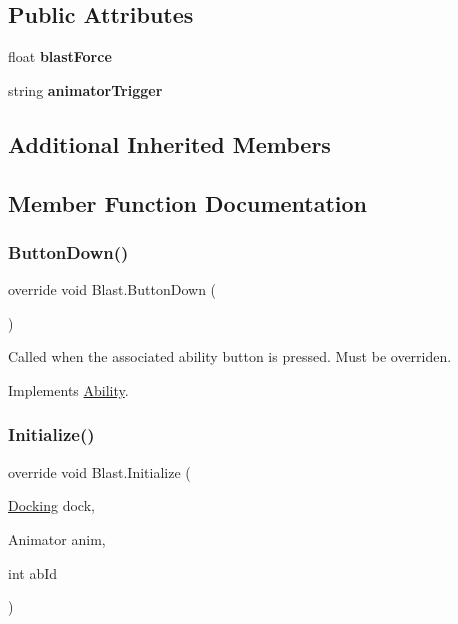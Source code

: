 \subsection*{Public Attributes}
\begin{DoxyCompactItemize}
\item 
\hypertarget{class_blast_af4eeda89a029eef37008a80e3200ee47}{}\label{class_blast_af4eeda89a029eef37008a80e3200ee47} 
float {\bfseries blast\+Force}
\item 
\hypertarget{class_blast_a5c073e6a97eff03cc1404778ab33aff6}{}\label{class_blast_a5c073e6a97eff03cc1404778ab33aff6} 
string {\bfseries animator\+Trigger}
\end{DoxyCompactItemize}
\subsection*{Additional Inherited Members}


\subsection{Member Function Documentation}
\hypertarget{class_blast_ab6e8d7899a858bc2da1978d40d266a63}{}\label{class_blast_ab6e8d7899a858bc2da1978d40d266a63} 
\subsubsection{\texorpdfstring{Button\+Down()}{ButtonDown()}}
{\footnotesize\ttfamily override void Blast.\+Button\+Down (\begin{DoxyParamCaption}{ }\end{DoxyParamCaption})\hspace{0.3cm}{\ttfamily [virtual]}}



Called when the associated ability button is pressed. Must be overriden. 



Implements \hyperlink{class_ability_a7722265862f8b29828315725415ce266}{Ability}.

\hypertarget{class_blast_a1c0b1bd2d101c05fdbe09d32a5c5c44a}{}\label{class_blast_a1c0b1bd2d101c05fdbe09d32a5c5c44a} 
\subsubsection{\texorpdfstring{Initialize()}{Initialize()}}
{\footnotesize\ttfamily override void Blast.\+Initialize (\begin{DoxyParamCaption}\item[{\hyperlink{class_docking}{Docking}}]{dock,  }\item[{Animator}]{anim,  }\item[{int}]{ab\+Id }\end{DoxyParamCaption})\hspace{0.3cm}{\ttfamily [virtual]}}



